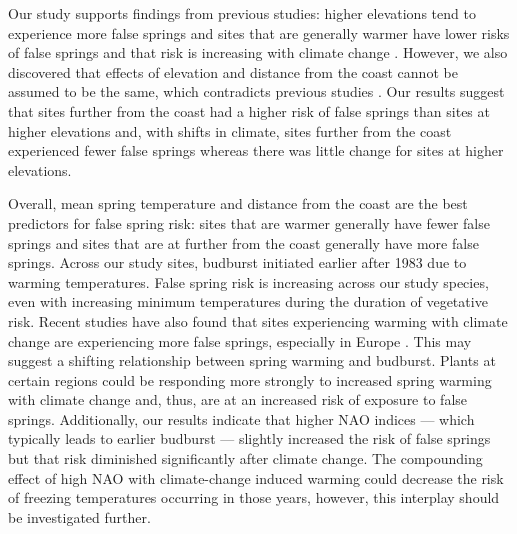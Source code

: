 \documentclass{article}\usepackage[]{graphicx}\usepackage[]{color}
\begin{document}
Our study supports findings from previous studies: higher elevations tend to experience more false springs \citep{Vitra2017} and sites that are generally warmer have lower risks of false springs \citep{Wypych2016} and that risk is increasing with climate change \citep{Liu2018}. However, we also discovered that effects of elevation and distance from the coast cannot be assumed to be the same, which contradicts previous studies \citep{Ma2018}. Our results suggest that sites further from the coast had a higher risk of false springs than sites at higher elevations and, with shifts in climate, sites further from the coast experienced fewer false springs whereas there was little change for sites at higher elevations. 
 
Overall, mean spring temperature and distance from the coast are the best predictors for false spring risk: sites that are warmer generally have fewer false springs and sites that are at further from the coast generally have more false springs. Across our study sites, budburst initiated earlier after 1983 due to warming temperatures. False spring risk is increasing across our study species, even with increasing minimum temperatures during the duration of vegetative risk. Recent studies have also found that sites experiencing warming with climate change are experiencing more false springs, especially in Europe \citep{Liu2018}. This may suggest a shifting relationship between spring warming and budburst. Plants at certain regions could be responding more strongly to increased spring warming with climate change and, thus, are at an increased risk of exposure to false springs. Additionally, our results indicate that higher NAO indices --- which typically leads to earlier budburst --- slightly increased the risk of false springs but that risk diminished significantly after climate change. The compounding effect of high NAO with climate-change induced warming could decrease the risk of freezing temperatures occurring in those years, however, this interplay should be investigated further. 
\end{document}
